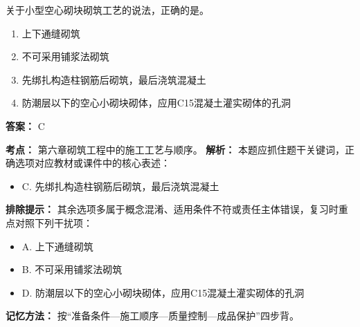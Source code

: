 \documentclass[UTF8,fontset=fandol,11pt]{ctexart}
\begin{document}
\begin{quizbox}[title={第 29 题}]
关于小型空心砌块砌筑工艺的说法，正确的是。\\
\begin{enumerate}[label=\Alph*.]
\item 上下通缝砌筑
\item 不可采用铺浆法砌筑
\item 先绑扎构造柱钢筋后砌筑，最后浇筑混凝土
\item 防潮层以下的空心小砌块砌体，应用C15混凝土灌实砌体的孔洞
\end{enumerate}
\textbf{答案：} C
\vspace{0.25em}
\begin{answerbox}[title={考点解析}]
\textbf{考点：} 第六章砌筑工程中的施工工艺与顺序。
\textbf{解析：} 本题应抓住题干关键词，正确选项对应教材或课件中的核心表述：
\begin{itemize}
\item C. 先绑扎构造柱钢筋后砌筑，最后浇筑混凝土
\end{itemize}
\textbf{排除提示：} 其余选项多属于概念混淆、适用条件不符或责任主体错误，复习时重点对照下列干扰项：
\begin{itemize}
\item A. 上下通缝砌筑
\item B. 不可采用铺浆法砌筑
\item D. 防潮层以下的空心小砌块砌体，应用C15混凝土灌实砌体的孔洞
\end{itemize}
\textbf{记忆方法：} 按“准备条件—施工顺序—质量控制—成品保护”四步背。
\end{answerbox}
\end{quizbox}
\end{document}
